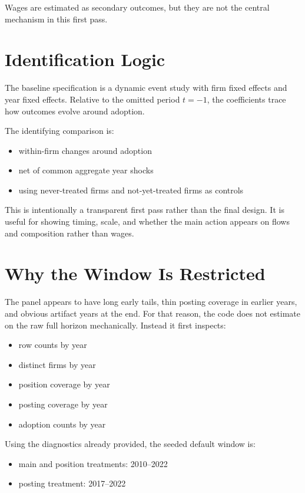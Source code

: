 \documentclass[11pt]{article}
\begin{document}
Wages are estimated as secondary outcomes, but they are not the central mechanism in this first pass.

\section*{Identification Logic}

The baseline specification is a dynamic event study with firm fixed effects and year fixed effects. Relative to the omitted period $t=-1$, the coefficients trace how outcomes evolve around adoption.

The identifying comparison is:

\begin{itemize}[leftmargin=1.5em]
    \item within-firm changes around adoption
    \item net of common aggregate year shocks
    \item using never-treated firms and not-yet-treated firms as controls
\end{itemize}

This is intentionally a transparent first pass rather than the final design. It is useful for showing timing, scale, and whether the main action appears on flows and composition rather than wages.

\section*{Why the Window Is Restricted}

The panel appears to have long early tails, thin posting coverage in earlier years, and obvious artifact years at the end. For that reason, the code does not estimate on the raw full horizon mechanically. Instead it first inspects:

\begin{itemize}[leftmargin=1.5em]
    \item row counts by year
    \item distinct firms by year
    \item position coverage by year
    \item posting coverage by year
    \item adoption counts by year
\end{itemize}

Using the diagnostics already provided, the seeded default window is:

\begin{itemize}[leftmargin=1.5em]
    \item main and position treatments: 2010--2022
    \item posting treatment: 2017--2022
\end{itemize}
\end{document}
